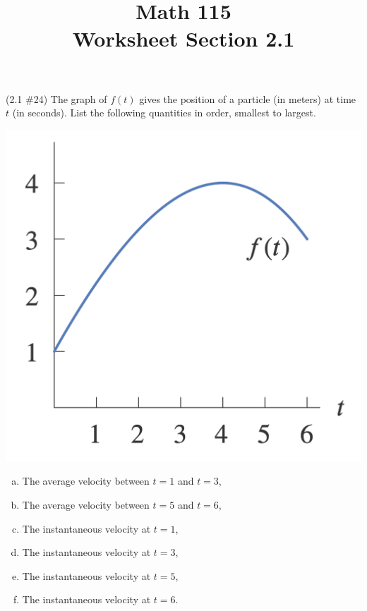 \documentclass[11pt]{exam}
\title{\vspace{-0.5in} Math 115 \\ Worksheet Section 2.1}
\date{}
\begin{document}
\maketitle
\vspace{-0.75in}
\begin{questions}
  \question (2.1 \#24) The graph of \(f(t)\) gives the position of a
  particle (in meters) at time \(t\) (in seconds). List the following quantities in order,
  smallest to largest.\\
  \begin{minipage}{0.4\linewidth}
    \includegraphics[scale=0.3]{Figures/no24graph.png}
  \end{minipage}
  \begin{minipage}{0.6\linewidth}
    \begin{enumerate}[(a)]
    \item The average velocity between \(t=1\) and \(t=3\),
    \item The average velocity between \(t=5\) and \(t=6\),
    \item The instantaneous velocity at \(t=1\),
    \item The instantaneous velocity at \(t=3\),
    \item The instantaneous velocity at \(t=5\),
    \item The instantaneous velocity at \(t=6\).
    \end{enumerate}
  \end{minipage}

\end{questions}
\end{document}
